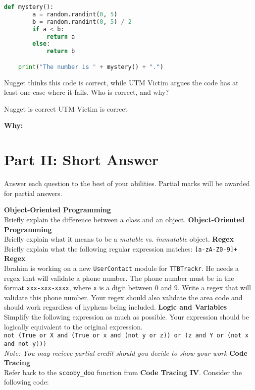\documentclass[letterpaper,12pt,addpoints]{exam}
\begin{document}
\begin{questions}
\begin{lstlisting}[language=Python, style=mystyle]
    def mystery():
        a = random.randint(0, 5)
        b = random.randint(0, 5) / 2
        if a < b:
            return a
        else:
            return b

    print("The number is " + mystery() + ".")
    \end{lstlisting}
    Nugget thinks this code is correct, while UTM Victim argues the code has at least one case where it fails. Who is correct, and why?
    \begin{choices}
        \choice Nugget is correct
        \choice UTM Victim is correct
    \end{choices}
    \textbf{Why:} \underline{\hspace{15cm}}


    \setcounter{question}{0}
    \clearpage
    \section*{Part II: Short Answer}
    Answer each question to the best of your abilities. Partial marks will be awarded for partial answers. 

    \question[5] \textbf{Object-Oriented Programming} \\
    Briefly explain the difference between a class and an object.
    \bigskip
    \bigskip
    \bigskip
    \bigskip
    \question[5] \textbf{Object-Oriented Programming} \\
    Briefly explain what it means to be a \textit{mutable} vs. \textit{immutable} object.
    \bigskip
    \bigskip
    \bigskip
    \bigskip
    \question[5] \textbf{Regex} \\
    Briefly explain what the following regular expression matches: \texttt{[a-zA-Z0-9]+} %
    \bigskip
    \bigskip
    \bigskip   
    \bigskip
    \question[5] \textbf{Regex} \\
    Ibrahim is working on a new \texttt{UserContact} module for \texttt{TTBTrackr}. He needs a regex that will validate a phone number. The phone number must be in the format \texttt{xxx-xxx-xxxx}, where \texttt{x} is a digit between 0 and 9. Write a regex that will validate this phone number. Your regex should also validate the area code and should work regardless of hyphens being included. 
    \bigskip
    \bigskip
    \bigskip   
    \bigskip
    \question[5] \textbf{Logic and Variables} \\
    Simplify the following expression as much as possible. Your expression should be logically equivalent to the original expression. \\
        \texttt{not (True or X and (True or x and (not y or z)) or (z and Y or (not x and not y)))
        } \\
    \textit{Note: You may recieve partial credit should you decide to show your work}
    \clearpage
    \question[10] \textbf{Code Tracing} \\
    Refer back to the \texttt{scooby\_doo} function from \textbf{Code Tracing IV}. Consider the following code:
    \clearpage


\end{questions}
\end{document}
